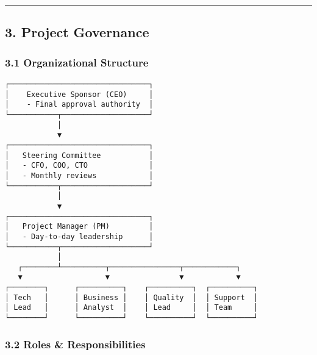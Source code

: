 \documentclass[
]{article}
\begin{document}
\begin{center}\rule{0.5\linewidth}{0.5pt}\end{center}

\hypertarget{project-governance}{%
\subsection{3. Project Governance}\label{project-governance}}

\hypertarget{organizational-structure}{%
\subsubsection{3.1 Organizational
Structure}\label{organizational-structure}}

\begin{verbatim}
┌────────────────────────────────┐
│    Executive Sponsor (CEO)     │
│    - Final approval authority  │
└───────────┬────────────────────┘
            │
            ▼
┌────────────────────────────────┐
│   Steering Committee           │
│   - CFO, COO, CTO              │
│   - Monthly reviews            │
└───────────┬────────────────────┘
            │
            ▼
┌────────────────────────────────┐
│   Project Manager (PM)         │
│   - Day-to-day leadership      │
└───────────┬────────────────────┘
            │
   ┌────────┴──────────┬────────────────┬────────────┐
   ▼                   ▼                ▼            ▼
┌────────┐      ┌──────────┐    ┌──────────┐  ┌──────────┐
│ Tech   │      │ Business │    │ Quality  │  │ Support  │
│ Lead   │      │ Analyst  │    │ Lead     │  │ Team     │
└────────┘      └──────────┘    └──────────┘  └──────────┘
\end{verbatim}

\hypertarget{roles-responsibilities}{%
\subsubsection{3.2 Roles \&
Responsibilities}\label{roles-responsibilities}}
\end{document}
